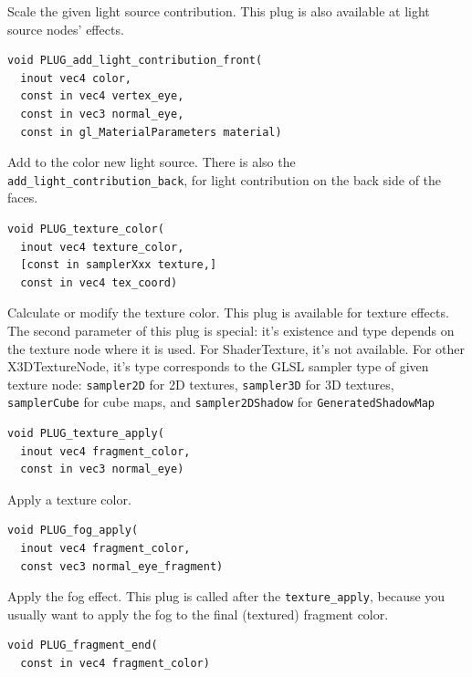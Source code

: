 \documentclass{acmsiggraph}                     %
\begin{document}
Scale the given light source contribution.
This plug is also available at light source nodes' effects.

\begin{Verbatim}[commandchars=\\\{\},frame=single]
void PLUG_add_light_contribution_front(
  inout vec4 color,
  const in vec4 vertex_eye,
  const in vec3 normal_eye,
  const in gl_MaterialParameters material)
\end{Verbatim}

Add to the color new light source.
There is also the \texttt{add\_light\_contribution\_back},
for light contribution on the back side of the faces.

\begin{Verbatim}[commandchars=\\\{\},frame=single]
void PLUG_texture_color(
  inout vec4 texture_color,
  [const in samplerXxx texture,]
  const in vec4 tex_coord)
\end{Verbatim}

Calculate or modify the texture color.
This plug is available for texture effects. The second parameter of
this plug is special: it's existence and type depends on the texture
node where it is used. For ShaderTexture, it's not available. For
other X3DTextureNode, it's type corresponds to the GLSL sampler type
of given texture node: \texttt{sampler2D} for 2D textures,
\texttt{sampler3D} for 3D textures, \texttt{samplerCube} for cube
maps, and \texttt{sampler2DShadow} for \texttt{GeneratedShadowMap}

\begin{Verbatim}[commandchars=\\\{\},frame=single]
void PLUG_texture_apply(
  inout vec4 fragment_color,
  const in vec3 normal_eye)
\end{Verbatim}

Apply a texture color.

\begin{Verbatim}[commandchars=\\\{\},frame=single]
void PLUG_fog_apply(
  inout vec4 fragment_color,
  const vec3 normal_eye_fragment)
\end{Verbatim}

Apply the fog effect. This plug is called after
the \texttt{texture\_apply}, because you usually want to apply the fog
to the final (textured) fragment color.

\begin{Verbatim}[commandchars=\\\{\},frame=single]
void PLUG_fragment_end(
  const in vec4 fragment_color)
\end{Verbatim}
\end{document}
